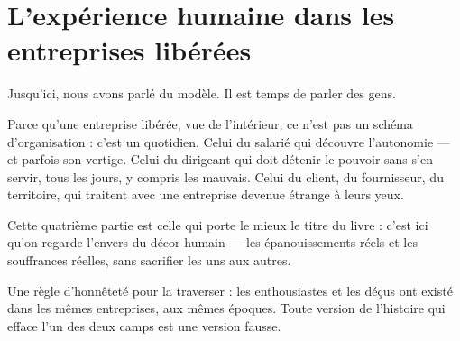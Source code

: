 \part{L'expérience humaine dans les entreprises libérées}

Jusqu'ici, nous avons parlé du modèle. Il est temps de parler des gens.

Parce qu'une entreprise libérée, vue de l'intérieur, ce n'est pas un schéma d'organisation : c'est un quotidien. Celui du salarié qui découvre l'autonomie — et parfois son vertige. Celui du dirigeant qui doit détenir le pouvoir sans s'en servir, tous les jours, y compris les mauvais. Celui du client, du fournisseur, du territoire, qui traitent avec une entreprise devenue étrange à leurs yeux.

Cette quatrième partie est celle qui porte le mieux le titre du livre : c'est ici qu'on regarde l'envers du décor humain — les épanouissements réels et les souffrances réelles, sans sacrifier les uns aux autres.

Une règle d'honnêteté pour la traverser : les enthousiastes et les déçus ont existé dans les mêmes entreprises, aux mêmes époques. Toute version de l'histoire qui efface l'un des deux camps est une version fausse.
